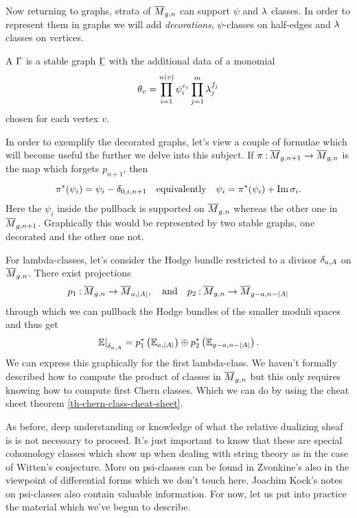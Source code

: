 \documentclass[12pt]{memoir}
\begin{document}
Now returning to graphs, strata of $\overline M_{g,n}$ can support $\psi$ and $\lambda$ classes. In order to represent them in graphs we will add \emph{decorations}, $\psi$-classes on half-edges and $\lambda$ classes on vertices. 

\begin{Def}
    A  $\Gamma$ is a stable graph $\underline{\Gamma}$ with the additional data of a monomial 
    $$\theta_v=\prod_{i=1}^{n(v)}\psi^{e_i}_i\prod_{j=1}^{m}\lambda^{f_j}_j$$
    chosen for each vertex $v$.
\end{Def}

\begin{Ex} 
    In order to exemplify the decorated graphs, let's view a couple of formulae which will become useful the further we delve into this subject. If $\pi\mathbin{:}\overline M_{g,n+1}\to\overline M_{g,n}$ is the map which forgets $p_{n+1}$, then 
    $$\pi^\ast(\psi_i)=\psi_i-\delta_{0,{i,n+1}}\quad\text{equivalently}\quad\psi_i=\pi^\ast(\psi_i)+\Im\sigma_i.$$
    Here the $\psi_i$ inside the pullback is supported on $\overline M_{g,n}$ whereas the other one in $\overline{M}_{g,n+1}$. Graphically this would be represented by two stable graphs, one decorated and the other one not.
\end{Ex}

\begin{Ex}%
    For lambda-classes, let's consider the Hodge bundle restricted to a divisor $\delta_{a,A}$ on $\overline M_{g,n}$. There exist projections 
    $$p_1\mathbin{:}\overline{M}_{g,n}\to\overline{M}_{a,|A|},\quad\text{and}\quad p_2\mathbin{:}\overline{M}_{g,n}\to\overline{M}_{g-a,n-|A|}$$
    through which we can pullback the Hodge bundles of the smaller moduli spaces and thus get 
    $$\left.\mathbb{E}\right|_{\delta_{a,A}}=p_1^\ast\left(\mathbb{E}_{a,|A|}\right)\oplus p_2^\ast\left(\mathbb{E}_{g-a,n-|A|}\right).$$
    We can express this graphically for the first lambda-class.
    We haven't formally described how to compute the product of classes in $\overline M_{g,n}$ but this only requires knowing how to compute first Chern classes. Which we can do by using the cheat sheet theorem \ref{th-chern-class-cheat-sheet}.
\end{Ex}
As before, deep understanding or knowledge of what the relative dualizing sheaf is is not necessary to proceed. It's just important to know that these are special cohomology classes which show up when dealing with string theory as in the case of Witten's conjecture. More on psi-classes can be found in Zvonkine's \cite{ZvonkineIntro} also in the viewpoint of differential forms which we don't touch here. Joachim Kock's notes on psi-classes \cite{KockPsiClasses} also contain valuable information. For now, let us put into practice the material which we've begun to describe. 
\end{document}
